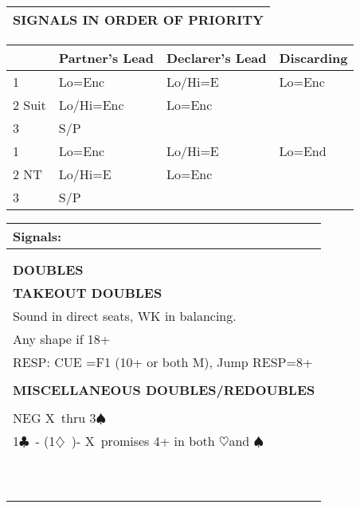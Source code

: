\documentclass{article}
\newcommand\C{\ensuremath{\clubsuit}}
\newcommand\D{\ensuremath{\diamondsuit}}
\renewcommand\H{\ensuremath{\heartsuit}}
\renewcommand\S{\ensuremath{\spadesuit}}
\newcommand\X{{\footnotesize X}}
\begin{document}
\begin{minipage}{90mm}
\begin{tabular}{| p{88mm} |}
		\textbf{SIGNALS IN ORDER OF PRIORITY} \\ \hline
	\end{tabular}
	\begin{tabular}{| p{8.9mm} | p{22mm} | p{22mm} | p{22mm} |}
		       & Partner's Lead & Declarer's Lead & Discarding \\ \hline
		1      &Lo=Enc          & Lo/Hi=E         & Lo=Enc \\ \hline
		2 Suit &Lo/Hi=Enc       & Lo=Enc          & \\ \hline
		3      &S/P             &                 & \\ \hline
		1      &Lo=Enc          & Lo/Hi=E         & Lo=End \\ \hline
		2 NT   &Lo/Hi=E         & Lo=Enc          & \\ \hline
		3      &S/P             &                 & \\ \hline
	\end{tabular}
	\begin{tabular}{| p{88mm} |}
		Signals: \\ \hline
		\\ \hline
		\\ \hline \hline
		\cellcolor[gray]{0.9} \textbf{DOUBLES} \\ \hline
		\textbf{TAKEOUT DOUBLES} \\ \hline
                Sound in direct seats, WK in balancing. 
		\\ \hline
                Any shape if 18+
		\\ \hline
                RESP: CUE =F1 (10+ or both M), Jump RESP=8+  
		\\ \hline
		\\ \hline
		\textbf{MISCELLANEOUS DOUBLES/REDOUBLES} \\ \hline
		\\ \hline
                NEG \X\ thru 3\S\
		\\ \hline
                1\C\ - (1\D\ )- \X\ promises 4+ in both \H and \S
		\\ \hline
		\\ \hline
		\\ \hline
		\\ \hline
		\\ \hline
		\\ \hline
		\\ \hline
		\\ \hline
		\\ \hline
		\\ \hline
		\\ \hline
	\end{tabular}
\end{minipage}
\end{document}
